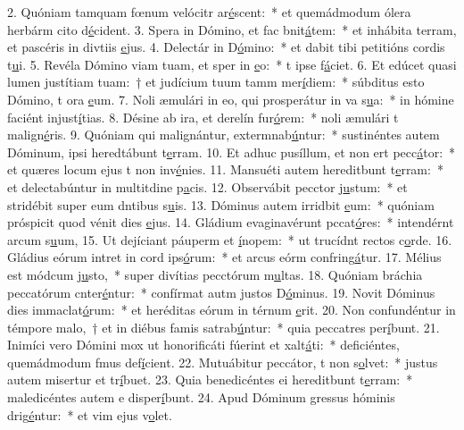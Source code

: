 2. Quóniam tamquam fœnum velócitr ar\uline{é}scent:~* et quemádmodum ólera herbárm cito d\uline{é}cident.
3. Spera in Dómino, et fac bnit\uline{á}tem:~* et inhábita terram, et pascéris in divtiis \uline{e}jus.
4. Delectár in D\uline{ó}mino:~* et dabit tibi petitións cordis t\uline{u}i.
5. Revéla Dómino viam tuam, et sper in \uline{e}o:~* t ipse f\uline{á}ciet.
6. Et edúcet quasi lumen justítiam tuam:~† et judícium tuum tamm mer\uline{í}diem:~* súbditus esto Dómino, t ora \uline{e}um.
7. Noli æmulári in eo, qui prosperátur in va s\uline{u}a:~* in hómine faciént injust\uline{í}tias.
8. Désine ab ira, et derelín fur\uline{ó}rem:~* noli æmulári t malign\uline{é}ris.
9. Quóniam qui malignántur, extermnab\uline{ú}ntur:~* sustinéntes autem Dóminum, ipsi heredtábunt t\uline{e}rram.
10. Et adhuc pusíllum, et non ert pecc\uline{á}tor:~* et quæres locum ejus t non inv\uline{é}nies.
11. Mansuéti autem hereditbunt t\uline{e}rram:~* et delectabúntur in multitdine p\uline{a}cis.
12. Observábit pecctor j\uline{u}stum:~* et stridébit super eum dntibus s\uline{u}is.
13. Dóminus autem irridbit \uline{e}um:~* quóniam próspicit quod vénit dies \uline{e}jus.
14. Gládium evaginavérunt pccat\uline{ó}res:~* intendérnt arcum s\uline{u}um,
15. Ut dejíciant páuperm et \uline{í}nopem:~* ut trucídnt rectos c\uline{o}rde.
16. Gládius eórum intret in cord ips\uline{ó}rum:~* et arcus eórm confring\uline{á}tur.
17. Mélius est módcum j\uline{u}sto,~* super divítias pecctórum m\uline{u}ltas.
18. Quóniam bráchia peccatórum cnter\uline{é}ntur:~* confírmat autm justos D\uline{ó}minus.
19. Novit Dóminus dies immaclat\uline{ó}rum:~* et heréditas eórum in térnum \uline{e}rit.
20. Non confundéntur in témpore malo,~† et in diébus famis satrab\uline{ú}ntur:~* quia peccatres per\uline{í}bunt.
21. Inimíci vero Dómini mox ut honorificáti fúerint et xalt\uline{á}ti:~* deficiéntes, quemádmodum fmus def\uline{í}cient.
22. Mutuábitur peccátor, t non s\uline{o}lvet:~* justus autem misertur et tr\uline{í}buet.
23. Quia benedicéntes ei hereditbunt t\uline{e}rram:~* maledicéntes autem e disper\uline{í}bunt.
24. Apud Dóminum gressus hóminis drig\uline{é}ntur:~* et vim ejus v\uline{o}let.
